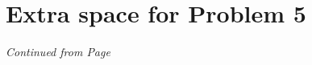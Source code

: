 \documentclass[11pt]{article}
\begin{document}
 
 \label{pg:p4-continuation}
 \newpage
 
 
 \section*{Extra space for Problem 5}
 \emph{Continued from Page \pageref{pg:end-of-p5}}
 
 \label{pg:p5-continuation}
 \newpage
 
 
% 
% 
% 
% 
% 
\end{document}
